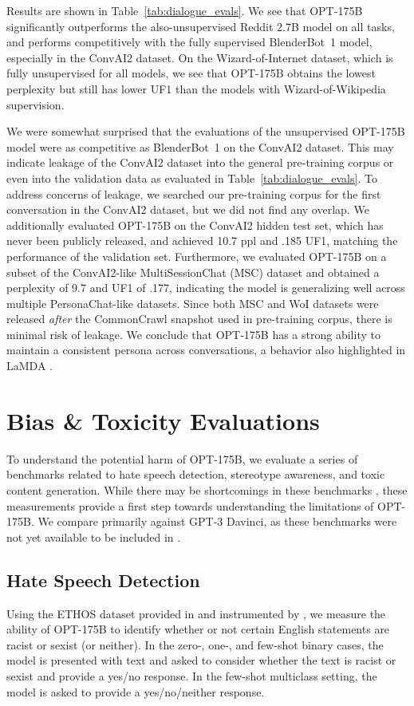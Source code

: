 Results are shown in Table~\ref{tab:dialogue_evals}. We see that {OPT-175B} significantly outperforms the also-unsupervised Reddit 2.7B model on all tasks, and performs competitively with the fully supervised BlenderBot~1 model, especially in the ConvAI2 dataset. On the Wizard-of-Internet dataset, which is fully unsupervised for all models, we see that {OPT-175B} obtains the lowest perplexity but still has lower UF1 than the models with Wizard-of-Wikipedia supervision.

We were somewhat surprised that the evaluations of the unsupervised {OPT-175B} model were as competitive as BlenderBot~1 on the ConvAI2 dataset. This may indicate leakage of the ConvAI2 dataset into the general pre-training corpus or even into the validation data as evaluated in Table~\ref{tab:dialogue_evals}. To address concerns of leakage, we searched our pre-training corpus for the first conversation in the ConvAI2 dataset, but we did not find any overlap. We additionally evaluated {OPT-175B} on the ConvAI2 hidden test set, which has never been publicly released, and achieved 10.7 ppl and .185 UF1, matching the performance of the validation set. Furthermore, we evaluated {OPT-175B} on a subset of the ConvAI2-like MultiSessionChat (MSC) dataset \cite{xu2021beyond} and obtained a perplexity of 9.7 and UF1 of .177, indicating the model is generalizing well across multiple PersonaChat-like datasets. Since both MSC and WoI datasets were released \textit{after} the CommonCrawl snapshot used in pre-training corpus, there is minimal risk of leakage. We conclude that {OPT-175B} has a strong ability to maintain a consistent persona across conversations, a behavior also highlighted in LaMDA \cite{thoppilan2022lamda}.

\section{Bias \& Toxicity Evaluations}
\label{sec:rai_evals}

To understand the potential harm of {OPT-175B}, we evaluate a series of benchmarks related to hate speech detection, stereotype awareness, and toxic content generation.  While there may be shortcomings in these benchmarks \cite{blodgett-etal-2021-stereotyping,Jacobs2021Fairness}, these measurements provide a first step towards understanding the limitations of {OPT-175B}.  We compare primarily against GPT-3 {Davinci}, as these benchmarks were not yet available to be included in  \citet{brown2020gpt3}.

\subsection{Hate Speech Detection}
\label{sec:hate_speech_detect}
Using the ETHOS dataset provided in \citet{ethos2020} and instrumented by \citet{chiu2021detecting}, we measure the ability of {OPT-175B} to identify whether or not certain English statements are racist or sexist (or neither). In the zero-, one-, and few-shot binary cases, the model is presented with text and asked to consider whether the text is racist or sexist and provide a yes/no response. In the few-shot multiclass setting, the model is asked to provide a yes/no/neither response.

